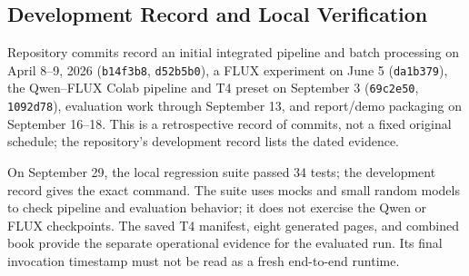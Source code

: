 \subsection{Development Record and Local Verification}

Repository commits record an initial integrated pipeline and batch processing on April 8--9, 2026 (\nolinkurl{b14f3b8}, \nolinkurl{d52b5b0}), a FLUX experiment on June 5 (\nolinkurl{da1b379}), the Qwen--FLUX Colab pipeline and T4 preset on September 3 (\nolinkurl{69c2e50}, \nolinkurl{1092d78}), evaluation work through September 13, and report/demo packaging on September 16--18. This is a retrospective record of commits, not a fixed original schedule; the repository's development record lists the dated evidence.

On September 29, the local regression suite passed 34 tests; the development record gives the exact command. The suite uses mocks and small random models to check pipeline and evaluation behavior; it does not exercise the Qwen or FLUX checkpoints. The saved T4 manifest, eight generated pages, and combined book provide the separate operational evidence for the evaluated run. Its final invocation timestamp must not be read as a fresh end-to-end runtime.
